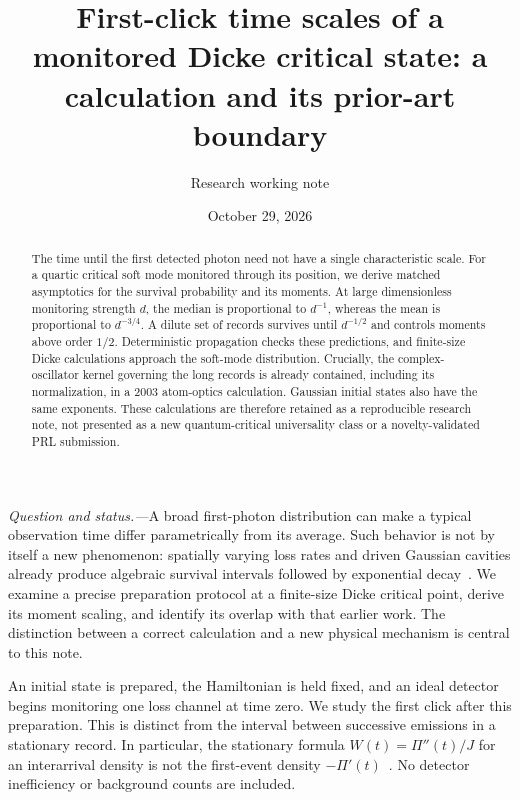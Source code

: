 \documentclass[aps,prl,reprint,superscriptaddress,nofootinbib]{revtex4-2}
\begin{document}
\title{First-click time scales of a monitored Dicke critical state: a calculation and its prior-art boundary}
\author{Research working note}
\noaffiliation
{}
\date{October 29, 2026}
\begin{abstract}
The time until the first detected photon need not have a single characteristic scale. For a quartic critical soft mode monitored through its position, we derive matched asymptotics for the survival probability and its moments. At large dimensionless monitoring strength $d$, the median is proportional to $d^{-1}$, whereas the mean is proportional to $d^{-3/4}$. A dilute set of records survives until $d^{-1/2}$ and controls moments above order $1/2$. Deterministic propagation checks these predictions, and finite-size Dicke calculations approach the soft-mode distribution. Crucially, the complex-oscillator kernel governing the long records is already contained, including its normalization, in a 2003 atom-optics calculation. Gaussian initial states also have the same exponents. These calculations are therefore retained as a reproducible research note, not presented as a new quantum-critical universality class or a novelty-validated PRL submission.
\end{abstract}
\maketitle

\emph{Question and status.---}A broad first-photon distribution can make a typical observation time differ parametrically from its average. Such behavior is not by itself a new phenomenon: spatially varying loss rates and driven Gaussian cavities already produce algebraic survival intervals followed by exponential decay~\cite{Fedorov,Portugal}. We examine a precise preparation protocol at a finite-size Dicke critical point, derive its moment scaling, and identify its overlap with that earlier work. The distinction between a correct calculation and a new physical mechanism is central to this note.

An initial state is prepared, the Hamiltonian is held fixed, and an ideal detector begins monitoring one loss channel at time zero. We study the first click after this preparation. This is distinct from the interval between successive emissions in a stationary record. In particular, the stationary formula $W(t)=\Pi''(t)/J$ for an interarrival density is not the first-event density $-\Pi'(t)$~\cite{Portugal}. No detector inefficiency or background counts are included.
\end{document}
